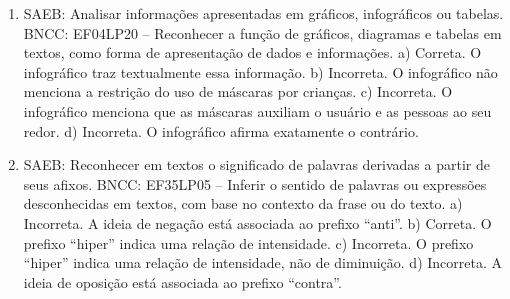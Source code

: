 \begin{enumerate}
\item
SAEB: Analisar informações apresentadas em gráficos, infográficos ou tabelas. BNCC: EF04LP20 -- Reconhecer a função de gráficos, diagramas e tabelas em textos, como forma de apresentação de dados e informações. a) Correta. O infográfico traz textualmente essa informação. b) Incorreta. O infográfico não menciona a restrição do uso de máscaras por crianças. c) Incorreta. O infográfico menciona que as máscaras auxiliam o usuário e as pessoas ao seu redor. d) Incorreta. O infográfico afirma exatamente o contrário.

\item
SAEB: Reconhecer em textos o significado de palavras derivadas a partir de seus afixos. BNCC: EF35LP05 -- Inferir o sentido de palavras ou expressões desconhecidas em textos, com base no contexto da frase ou do texto. a) Incorreta. A ideia de negação está associada ao prefixo ``anti''. b) Correta. O prefixo ``hiper'' indica uma relação de intensidade. c) Incorreta. O prefixo ``hiper'' indica uma relação de intensidade, não de diminuição. d) Incorreta. A ideia de oposição está associada ao prefixo ``contra''.
\end{enumerate}



